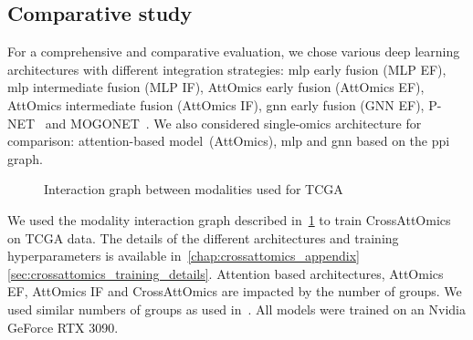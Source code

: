\documentclass[../main.tex]{subfiles}
\begin{document}
 \subsection{Comparative study}
     For a comprehensive and comparative evaluation, we chose various deep learning architectures with different integration strategies: \gls{mlp} early fusion (MLP EF), \gls{mlp} intermediate fusion (MLP IF), AttOmics early fusion (AttOmics EF), AttOmics intermediate fusion (AttOmics IF), \gls{gnn} early fusion (GNN EF), P-NET~\cite{PNet} and MOGONET~\cite{MOGONET}.
     We also considered single-omics architecture for comparison: attention-based model~(AttOmics), \gls{mlp} and \gls{gnn} based on the \gls{ppi} graph.
     \begin{figure}
        \centering
        \vspace{-1\intextsep}
         \small
         \caption{Interaction graph between modalities used for TCGA}\label{fig:tcga_graph}
     \end{figure}
     We used the modality interaction graph described in~\cref{fig:tcga_graph} to train CrossAttOmics on TCGA data.
     The details of the different architectures and training hyperparameters is available in~\cref{chap:crossattomics_appendix} \cref{sec:crossattomics_training_details}.
     Attention based architectures, AttOmics EF, AttOmics IF and CrossAttOmics are impacted by the number of groups.
     We used similar numbers of groups as used in~\cite{AttOmics}.
     All models were trained on an Nvidia GeForce RTX 3090.
\end{document}

